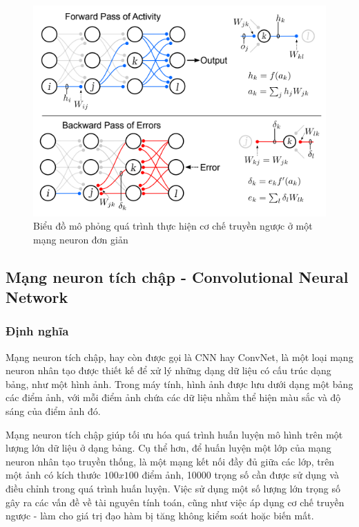 \begin{figure}[H]
    \centering
    \includegraphics{pics/Chapter3/backprop.png}
    \caption{Biểu đồ mô phỏng quá trình thực hiện cơ chế truyền ngược ở một mạng neuron đơn giản \cite{lillicrap2020backpropagation}}
    \label{fig:enter-label}
\end{figure}

\subsection{Mạng neuron tích chập - Convolutional Neural Network}
\subsubsection*{Định nghĩa}
Mạng neuron tích chập, hay còn được gọi là CNN hay ConvNet, là một loại mạng neuron nhân tạo được thiết kế để xử lý những dạng dữ liệu có cấu trúc dạng bảng, như một hình ảnh. Trong máy tính, hình ảnh được lưu dưới dạng một bảng các điểm ảnh, với mỗi điểm ảnh chứa các dữ liệu nhằm thể hiện màu sắc và độ sáng của điểm ảnh đó.


Mạng neuron tích chập giúp tối ưu hóa quá trình huấn luyện mô hình trên một lượng lớn dữ liệu ở dạng bảng. Cụ thể hơn, để huấn luyện một lớp của mạng neuron nhân tạo truyền thống, là một mạng kết nối đầy đủ giữa các lớp, trên một ảnh có kích thước $100x100$ điểm ảnh, 10000 trọng số cần được sử dụng và điều chỉnh trong quá trình huấn luyện. Việc sử dụng một số lượng lớn trọng số gây ra các vấn đề về tài nguyên tính toán, cũng như việc áp dụng cơ chế truyền ngược - làm cho giá trị đạo hàm bị tăng không kiểm soát hoặc biến mất.

